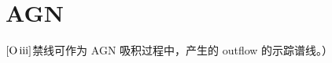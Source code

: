 \documentclass[../天体物理基础.tex]{subfiles}
\begin{document}
\section{AGN}
$\left[\ce{O}\,\mathrm{\uppercase\expandafter{\romannumeral3}}\right]$禁线可作为 AGN 吸积过程中，产生的 outflow 的示踪谱线。）

\printbibliography
\end{document}
